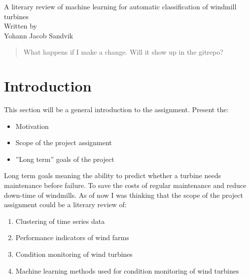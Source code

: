 \documentclass[12pt,english,a4paper,openright]{article}
\begin{document}
\setlength\parindent{0pt} %

\pagestyle{fancy}

\begin{titlepage}
    \centering
    
    {\LARGE A literary review of machine learning for automatic classification of windmill turbines} \\ [\baselineskip]
    
    {\Large Written by} \\ 
    {\Large Yohann Jacob Sandvik } \\

    \begin{abstract}
        What happens if I make a change. Will it show up in the gitrepo?
    \end{abstract}

\end{titlepage}


\fancyhf{}

\tableofcontents
\newpage


\section{Introduction}
This section will be a general introduction to the assignment. 
Present the:
\begin{itemize}
    \item Motivation
    \item Scope of the project assignment
    \item ''Long term'' goals of the project
\end{itemize}

Long term goals meaning the ability to predict whether a turbine needs maintenance before failure. To save the costs of regular maintenance and reduce down-time of windmills. As of now I was thinking that the scope of the project assignment could be a literary review of:

\begin{enumerate}
    \item Clustering of time series data
    \item Performance indicators of wind farms
    \item Condition monitoring of wind turbines
    \item Machine learning methods used for condition monitoring of wind turbines
\end{enumerate}
\end{document}
